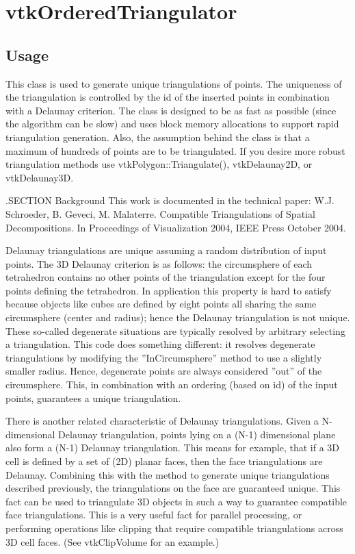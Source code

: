\section{vtkOrderedTriangulator}

\subsection{Usage}

 This class is used to generate unique triangulations of points. The
 uniqueness of the triangulation is controlled by the id of the inserted
 points in combination with a Delaunay criterion. The class is designed to
 be as fast as possible (since the algorithm can be slow) and uses block
 memory allocations to support rapid triangulation generation. Also, the
 assumption behind the class is that a maximum of hundreds of points are to
 be triangulated. If you desire more robust triangulation methods use
 vtkPolygon::Triangulate(), vtkDelaunay2D, or vtkDelaunay3D.

 .SECTION Background
 This work is documented in the technical paper: W.J. Schroeder, B. Geveci,
 M. Malaterre. Compatible Triangulations of Spatial Decompositions. In
 Proceedings of Visualization 2004, IEEE Press October 2004.

 Delaunay triangulations are unique assuming a random distribution of input
 points. The 3D Delaunay criterion is as follows: the circumsphere of each
 tetrahedron contains no other points of the triangulation except for the
 four points defining the tetrahedron.  In application this property is
 hard to satisfy because objects like cubes are defined by eight points all
 sharing the same circumsphere (center and radius); hence the Delaunay
 triangulation is not unique.  These so-called degenerate situations are
 typically resolved by arbitrary selecting a triangulation. This code does
 something different: it resolves degenerate triangulations by modifying
 the ''InCircumsphere'' method to use a slightly smaller radius. Hence,
 degenerate points are always considered ''out'' of the circumsphere. This,
 in combination with an ordering (based on id) of the input points,
 guarantees a unique triangulation.

 There is another related characteristic of Delaunay triangulations. Given
 a N-dimensional Delaunay triangulation, points lying on a (N-1) dimensional
 plane also form a (N-1) Delaunay triangulation. This means for example,
 that if a 3D cell is defined by a set of (2D) planar faces, then the
 face triangulations are Delaunay. Combining this with the method to
 generate unique triangulations described previously, the triangulations
 on the face are guaranteed unique. This fact can be used to triangulate
 3D objects in such a way to guarantee compatible face triangulations.
 This is a very useful fact for parallel processing, or performing
 operations like clipping that require compatible triangulations across
 3D cell faces. (See vtkClipVolume for an example.)

